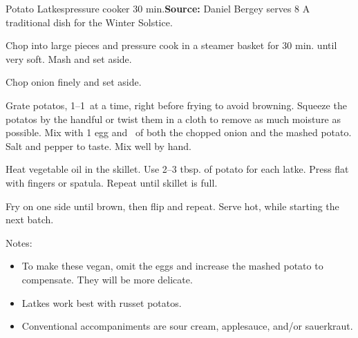 \begin{recipe}{Potato Latkes}{pressure cooker \hfill 30 min.}{\textbf{Source:} Daniel Bergey \hfill serves 8}
  \freeform A traditional dish for the Winter Solstice.

Chop into large pieces and pressure cook in a steamer basket for 30 min. until very soft. Mash and set aside.

Chop onion finely and set aside.

Grate potatos, 1--1\ at a time, right before frying to avoid browning. Squeeze the potatos by the handful or twist them in a cloth to remove as much moisture as possible. Mix with 1 egg and \ of both the chopped onion and the mashed potato. Salt and pepper to taste. Mix well by hand.

\newstep Heat vegetable oil in the skillet. Use 2--3 tbsp. of potato for each latke. Press flat with fingers or spatula. Repeat until skillet is full.

\newstep Fry on one side until brown, then flip and repeat. Serve hot, while starting the next batch.

\freeform Notes:
\begin{itemize}
  \item To make these vegan, omit the eggs and increase the mashed potato to compensate. They will be more delicate.
  \item Latkes work best with russet potatos.
  \item Conventional accompaniments are sour cream, applesauce, and/or sauerkraut.
\end{itemize}
\end{recipe}